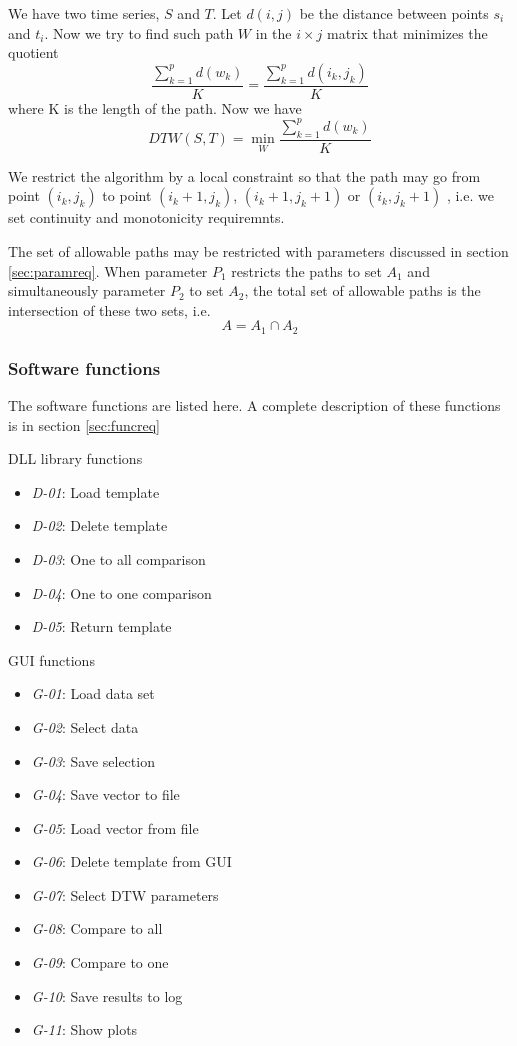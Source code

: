 \documentclass[a4paper,11pt]{article}
\begin{document}
We have two time series, $S$ and $T$. Let $d(i,j)$ be the distance between points $s_i$ and $t_i$. Now we try to find
such path $W$ in the $i \times j$ matrix that minimizes the quotient
\begin{equation}
\frac{\sum_{k=1}^p d(w_k)}{K} = \frac{\sum_{k=1}^p d(i_k,j_k)}{K}
\end{equation}
where K is the length of the path. Now we have
\begin{equation}
DTW(S,T)=\min_W \frac{\sum_{k=1}^p d(w_k)}{K}
\end{equation}

We restrict the algorithm by a local constraint so that the path may go from point $(i_k,j_k)$ to 
point $(i_k+1,j_k)$, $(i_k+1,j_k+1)$ or $(i_k,j_k+1)$ , i.e. we set continuity and monotonicity requiremnts.

The set of allowable paths may be restricted with parameters discussed in section \ref{sec:paramreq}. When parameter $P_1$
restricts the paths to set $A_1$ and simultaneously parameter $P_2$ to set $A_2$, the total set of allowable paths 
is the intersection of these two sets, i.e.
\begin{equation}
A=A_1 \cap A_2
\end{equation} 

\subsubsection{Software functions}
The software functions are listed here. A complete description of these functions is in section \ref{sec:funcreq}

\noindent DLL library functions
\begin{itemize}
\item \emph{D-01}: Load template
\item \emph{D-02}: Delete template
\item \emph{D-03}: One to all comparison
\item \emph{D-04}: One to one comparison
\item \emph{D-05}: Return template 
\end{itemize} 

\noindent GUI functions
\begin{itemize}
\item \emph{G-01}: Load data set 
\item \emph{G-02}: Select data
\item \emph{G-03}: Save selection
\item \emph{G-04}: Save vector to file
\item \emph{G-05}: Load vector from file
\item \emph{G-06}: Delete template from GUI
\item \emph{G-07}: Select DTW parameters
\item \emph{G-08}: Compare to all
\item \emph{G-09}: Compare to one
\item \emph{G-10}: Save results to log
\item \emph{G-11}: Show plots
\end{itemize}
\end{document}
